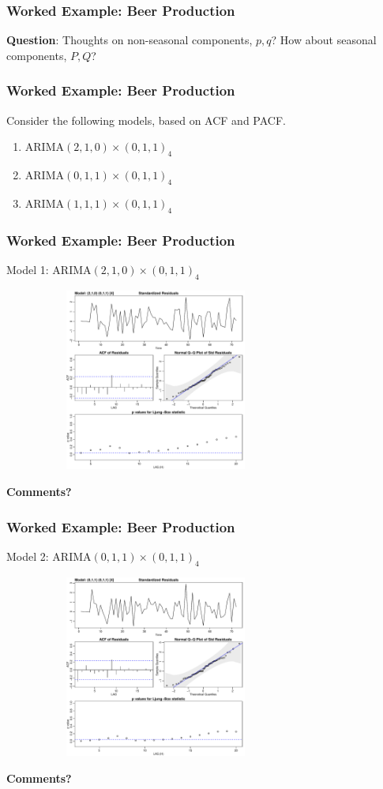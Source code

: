 \documentclass[%
xcolor=pdftex]{beamer}
\begin{document}
\begin{frame}
\frametitle{Worked Example: Beer Production}

\textbf{Question}: Thoughts on non-seasonal components, $p, q$? How about seasonal components, $P, Q$?
\end{frame}

\begin{frame}
\frametitle{Worked Example: Beer Production}

Consider the following models, based on ACF and PACF.

\begin{enumerate}
\item ARIMA$(2,1,0) \times (0,1,1)_4$
\item ARIMA$(0,1,1) \times (0,1,1)_4$
\item ARIMA$(1,1,1) \times (0,1,1)_4$
\end{enumerate}


\end{frame}

\begin{frame}
\frametitle{Worked Example: Beer Production}

Model 1: ARIMA$(2,1,0) \times (0,1,1)_4$

\includegraphics[width=100mm, height=60mm]{beer_m1.pdf}

\textbf{Comments?}
\end{frame}

\begin{frame}
\frametitle{Worked Example: Beer Production}

Model 2: ARIMA$(0,1,1) \times (0,1,1)_4$

\includegraphics[width=100mm, height=60mm]{beer_m2.pdf}

\textbf{Comments?}
\end{frame}
\end{document}
